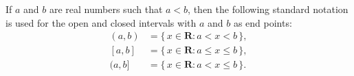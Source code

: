 If $a$ and $b$ are real numbers such that $a < b$, then the following standard notation is used for the open and closed intervals with $a$ and $b$ as end points:
$$
\begin{aligned}
(a, b) &= \{\, x \in \mathbf{R} : a < x < b \,\},\\
[a, b] &= \{\, x \in \mathbf{R} : a \leq x \leq b \,\},\\
(a, b] &= \{\, x \in \mathbf{R} : a < x \leq b \,\}.
\end{aligned}
$$
